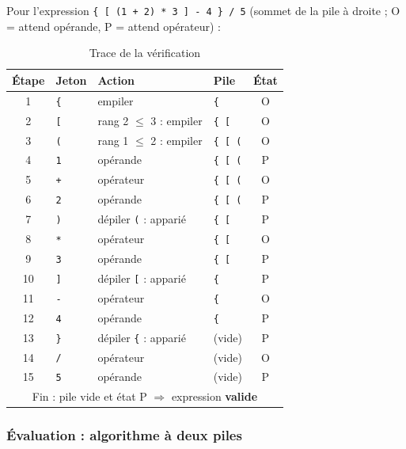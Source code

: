 \documentclass[11pt,a4paper]{article}
\newcommand{\code}[1]{\texttt{#1}}
\newcommand{\ok}{\textcolor{green!50!black}{\textbf{valide}}}
\begin{document}
Pour l'expression \code{\{ [ (1 + 2) * 3 ] - 4 \} / 5} (sommet de la pile à
droite ; O = attend opérande, P = attend opérateur) :

\begin{table}[H]
\centering
\small
\begin{tabular}{clllc}
  \toprule
  \textbf{Étape} & \textbf{Jeton} & \textbf{Action} & \textbf{Pile} & \textbf{État} \\
  \midrule
  1  & \code{\{} & empiler                        & \code{\{}       & O \\
  2  & \code{[}  & rang 2 $\le$ 3 : empiler       & \code{\{ [}     & O \\
  3  & \code{(}  & rang 1 $\le$ 2 : empiler       & \code{\{ [ (}   & O \\
  4  & \code{1}  & opérande                       & \code{\{ [ (}   & P \\
  5  & \code{+}  & opérateur                      & \code{\{ [ (}   & O \\
  6  & \code{2}  & opérande                       & \code{\{ [ (}   & P \\
  7  & \code{)}  & dépiler \code{(} : apparié     & \code{\{ [}     & P \\
  8  & \code{*}  & opérateur                      & \code{\{ [}     & O \\
  9  & \code{3}  & opérande                       & \code{\{ [}     & P \\
  10 & \code{]}  & dépiler \code{[} : apparié     & \code{\{}       & P \\
  11 & \code{-}  & opérateur                      & \code{\{}       & O \\
  12 & \code{4}  & opérande                       & \code{\{}       & P \\
  13 & \code{\}} & dépiler \code{\{} : apparié    & (vide)          & P \\
  14 & \code{/}  & opérateur                      & (vide)          & O \\
  15 & \code{5}  & opérande                       & (vide)          & P \\
  \midrule
  \multicolumn{5}{c}{Fin : pile vide et état P $\Rightarrow$ expression \ok} \\
  \bottomrule
\end{tabular}
\caption{Trace de la vérification}
\end{table}

\subsubsection{Évaluation : algorithme à deux piles}
\end{document}
